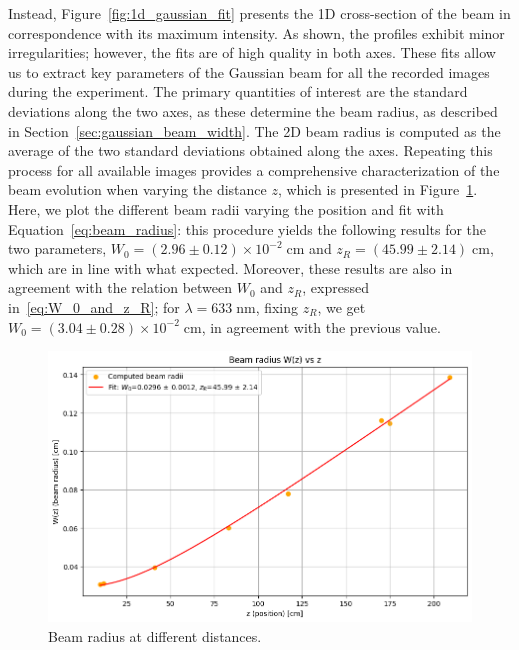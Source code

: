 \documentclass[prl,twocolumn]{revtex4-1}
\begin{document}
Instead, Figure~\ref{fig:1d_gaussian_fit} presents the 1D cross-section of the beam in correspondence with its maximum intensity. As shown, the profiles exhibit minor irregularities; however, the fits are of high quality in both axes. These fits allow us to extract key parameters of the Gaussian beam for all the recorded images during the experiment. The primary quantities of interest are the standard deviations along the two axes, as these determine the beam radius, as described in Section~\ref{sec:gaussian_beam_width}. The 2D beam radius is computed as the average of the two standard deviations obtained along the axes. Repeating this process for all available images provides a comprehensive characterization of the beam evolution when varying the distance $z$, which is presented in Figure~\ref{fig:beam_radius_fit}. Here, we plot the different beam radii varying the position and fit with Equation~\eqref{eq:beam_radius}: this procedure yields the following results for the two parameters, $W_0 = (2.96 \pm 0.12)\times 10^{-2} \; \text{cm}$ and $z_R = (45.99 \pm 2.14) \; \text{cm}$, which are in line with what expected. Moreover, these results are also in agreement with the relation between $W_0$ and $z_R$, expressed in~\eqref{eq:W_0_and_z_R}; for $\lambda=633 \;\text{nm}$, fixing $z_R$, we get   $W_0 = (3.04 \pm 0.28)\times 10^{-2} \; \text{cm}$, in agreement with the previous value.

\begin{figure}
    \centering
    \includegraphics[width=\linewidth]{Images/beam_radius_fit.png}
    \caption{Beam radius at different distances.}
    \label{fig:beam_radius_fit}
\end{figure}
\end{document}
